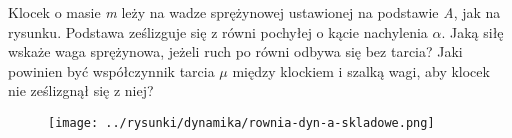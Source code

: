 Klocek o masie \emph{m} leży na wadze sprężynowej ustawionej na podstawie \emph{A}, jak na rysunku. Podstawa ześlizguje się z równi pochyłej o kącie nachylenia \emph{$\alpha$}. Jaką siłę wskaże waga sprężynowa, jeżeli ruch po równi odbywa się bez tarcia? Jaki powinien być współczynnik tarcia \emph{$\mu$} między klockiem i szalką wagi, aby klocek nie ześlizgnął się z niej?

\begin{figure}[H]
	\centering
	\texttt{[image: ../rysunki/dynamika/rownia-dyn-a-skladowe.png]}
\end{figure}

